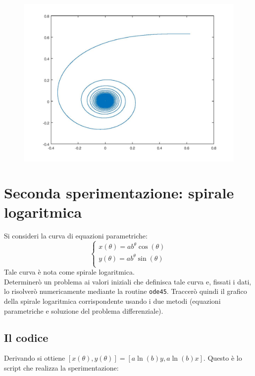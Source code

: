 \documentclass{article}
\begin{document}
	\begin{figure}[htp!]
		\centering 
		\includegraphics[width=\textwidth]{7_1_b.jpeg}
	\end{figure}
	\newpage
	\section{Seconda sperimentazione: spirale logaritmica}
	Si consideri la curva di equazioni parametriche:
	\begin{equation}
	\begin{cases}
	x(\theta)=ab^\theta \cos(\theta) \\
	y(\theta)=ab^\theta \sin(\theta) \\
	\end{cases}
	\end{equation}
	Tale curva è nota come spirale logaritmica.\\
	Determinerò un problema ai valori iniziali che definisca tale curva e, fissati i dati, lo risolverò numericamente mediante la routine {\tt ode45}. Traccerò quindi il grafico della spirale logaritmica corrispondente usando i due metodi (equazioni parametriche e soluzione del problema differenziale).\\
	\subsection{Il codice}
	Derivando si ottiene $[x(\theta), y(\theta)]=[a \ln(b) y, a \ln(b) x]$.
	Questo è lo script che realizza la sperimentazione:
	
	
\end{document}
